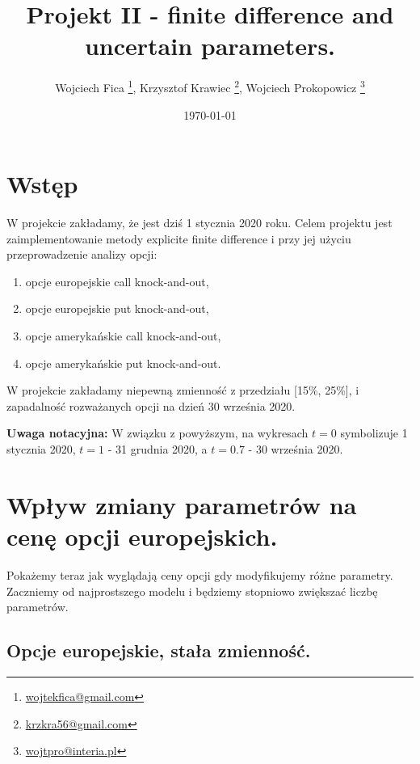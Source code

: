 \documentclass[12pt]{article}
\title{Projekt II - finite difference and uncertain parameters.}
\author{Wojciech Fica \footnote{\href{mailto:wojtekfica@gmail.com}{wojtekfica@gmail.com}}, Krzysztof Krawiec \footnote{\href{mailto:krzkra56@gmail.com}{krzkra56@gmail.com}}, Wojciech Prokopowicz \footnote{\href{mailto:wojtpro@interia.pl}{wojtpro@interia.pl}}}
\date{\today}
\begin{document}
\maketitle

\section{Wstęp}
W projekcie zakładamy, że jest dziś 1 stycznia 2020 roku. Celem projektu jest zaimplementowanie metody explicite finite difference i przy jej użyciu przeprowadzenie analizy opcji:
\begin{enumerate}
    \item opcje europejskie call knock-and-out,
    \item opcje europejskie put knock-and-out,
    \item opcje amerykańskie call knock-and-out,
    \item opcje amerykańskie put knock-and-out.
\end{enumerate}
W projekcie zakładamy niepewną zmienność z przedziału [15\%, 25\%], i zapadalność rozważanych opcji na dzień 30 września 2020. 

\textbf{Uwaga notacyjna:} W związku z powyższym, na wykresach $t=0$ symbolizuje 1 stycznia 2020, $t=1$  - 31 grudnia 2020, a $t=0.7$  - 30 września 2020.

\section{Wpływ zmiany parametrów na cenę opcji europejskich.}
Pokażemy teraz jak wyglądają ceny opcji gdy modyfikujemy różne parametry. Zaczniemy od najprostszego modelu i będziemy stopniowo zwiększać liczbę parametrów.  

\subsection{Opcje europejskie, stała zmienność.}
\end{document}
